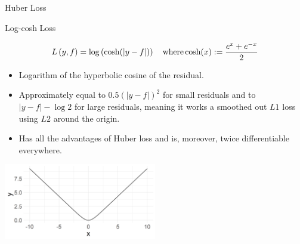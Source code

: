 \documentclass[11pt,compress,t,notes=noshow, xcolor=table]{beamer}
\begin{document}
\begin{vbframe}{Huber Loss}


\end{vbframe}

\begin{vbframe}{Log-cosh Loss}


$$
L\left(y, f\right) = \log \left( \cosh(\left|y - f\right|) \right) \quad \text{where}\,\text{cosh}(x):=\frac{e^x+e^{-x}}{2}
$$

\normalsize
\begin{itemize}
\item Logarithm of the hyperbolic cosine of the residual.
\item Approximately equal to $0.5 (\left|y - f\right|)^2$ for small residuals and to $\left|y - f\right| - \log 2$ for large residuals, meaning it works a smoothed out $L1$ loss using $L2$ around the origin. %
\item Has all the advantages of Huber loss and is, moreover, twice differentiable everywhere.
\end{itemize}

\begin{center}
\includegraphics[width = 0.5\textwidth]{figure/loss_logcosh.png}
\end{center}


\end{vbframe}
\end{document}
